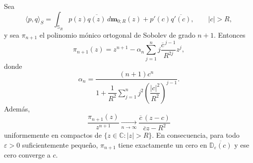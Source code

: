 \begin{lem}\label{lem:modelo_un_atomo_exterior}
	Sea
	\[
		\langle p,q\rangle_S
		=
		\int_{\mathbb S_R}p(z)\overline{q(z)}\,d\mathbf m_{0;R}(z)
		+
		p'(c)\overline{q'(c)},
		\qquad |c|>R,
	\]
	y sea $\pi_{n+1}$ el polinomio mónico ortogonal de Sobolev de grado $n+1$.
	Entonces
	\[
		\pi_{n+1}(z)=z^{n+1}-\alpha_n\sum_{j=1}^n j\frac{\overline c^{\,j-1}}{R^{2j}}z^j,
	\]
	donde
	\[
		\alpha_n=
		\frac{(n+1)c^n}{1+\dfrac1{R^2}\sum_{j=1}^n j^2\left(\dfrac{|c|^2}{R^2}\right)^{j-1}}.
	\]
	Además,
	\[
		\frac{\pi_{n+1}(z)}{z^{n+1}}
		\xrightarrow[n\to\infty]{}
		\frac{\overline c\,(z-c)}{\overline c z-R^2}
	\]
	uniformemente en compactos de $\{z\in\mathbb C:|z|>R\}$. En consecuencia, para todo $\varepsilon>0$ suficientemente pequeño, $\pi_{n+1}$ tiene exactamente un cero en $\overline{\mathbb D_\varepsilon(c)}$ y ese cero converge a $c$.
\end{lem}

